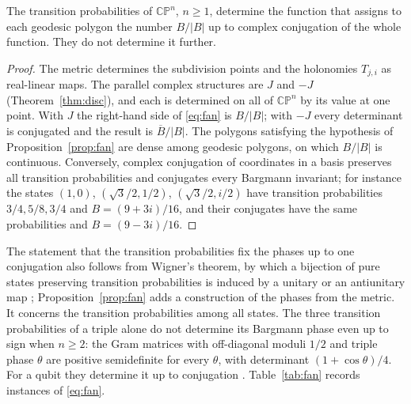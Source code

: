 \begin{corollary}\label{cor:onebit}
The transition probabilities of $\mathbb{CP}^n$, $n\ge1$, determine the function that assigns to each geodesic polygon the number $B/|B|$ up to complex conjugation of the whole function. They do not determine it further.
\end{corollary}
\begin{proof}
The metric determines the subdivision points and the holonomies $T_{j,i}$ as real-linear maps. The parallel complex structures are $J$ and $-J$ (Theorem~\ref{thm:disc}), and each is determined on all of $\mathbb{CP}^n$ by its value at one point. With $J$ the right-hand side of \eqref{eq:fan} is $B/|B|$; with $-J$ every determinant is conjugated and the result is $\overline{B}/|B|$. The polygons satisfying the hypothesis of Proposition~\ref{prop:fan} are dense among geodesic polygons, on which $B/|B|$ is continuous. Conversely, complex conjugation of coordinates in a basis preserves all transition probabilities and conjugates every Bargmann invariant; for instance the states $(1,0)$, $(\sqrt3/2,1/2)$, $(\sqrt3/2,i/2)$ have transition probabilities $3/4,5/8,3/4$ and $B=(9+3i)/16$, and their conjugates have the same probabilities and $B=(9-3i)/16$.
\end{proof}

The statement that the transition probabilities fix the phases up to one conjugation also follows from Wigner's theorem, by which a bijection of pure states preserving transition probabilities is induced by a unitary or an antiunitary map \cite{bargmann}; Proposition~\ref{prop:fan} adds a construction of the phases from the metric. It concerns the transition probabilities among all states. The three transition probabilities of a triple alone do not determine its Bargmann phase even up to sign when $n\ge2$: the Gram matrices with off-diagonal moduli $1/2$ and triple phase $\theta$ are positive semidefinite for every $\theta$, with determinant $(1+\cos\theta)/4$. For a qubit they determine it up to conjugation \cite{lwz}. Table~\ref{tab:fan} records instances of \eqref{eq:fan}.

